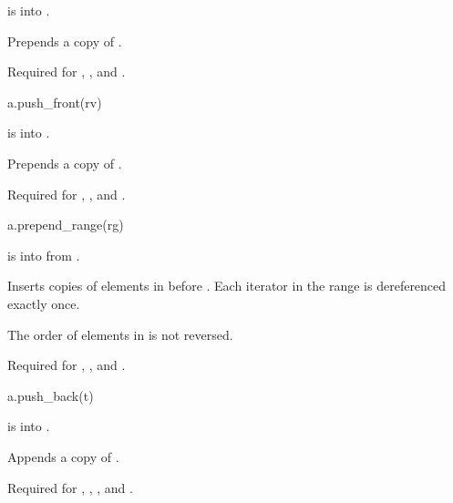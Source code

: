 \begin{itemdescr}
\pnum
\result
{}

\pnum
\expects
{} is  into .

\pnum
\effects
Prepends a copy of .

\pnum
\remarks
Required for
,
, and
.
\end{itemdescr}

\begin{itemdecl}
a.push_front(rv)
\end{itemdecl}

\begin{itemdescr}
\pnum
\result
{}

\pnum
\expects
{} is  into .

\pnum
\effects
Prepends a copy of .

\pnum
\remarks
Required for
,
, and
.
\end{itemdescr}

\begin{itemdecl}
a.prepend_range(rg)
\end{itemdecl}

\begin{itemdescr}
\pnum
\result
{}

\pnum
\expects
{} is  into 
from .

\pnum
\effects
Inserts copies of elements in  before .
Each iterator in the range  is dereferenced exactly once.
\begin{note}
The order of elements in  is not reversed.
\end{note}

\pnum
\remarks
Required for
,
, and
.
\end{itemdescr}

\begin{itemdecl}
a.push_back(t)
\end{itemdecl}

\begin{itemdescr}
\pnum
\result
{}

\pnum
\expects
{} is  into .

\pnum
\effects
Appends a copy of .

\pnum
\remarks
Required for
,
,
, and
.
\end{itemdescr}

